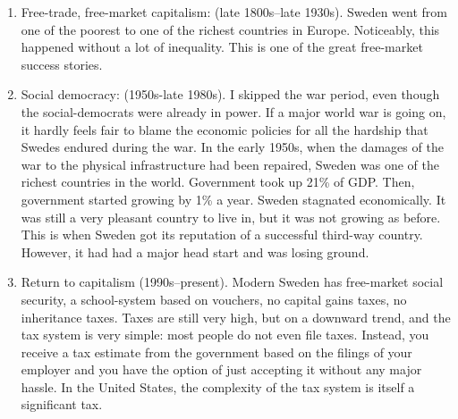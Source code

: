 \begin{enumerate}
\item Free-trade, free-market capitalism: (late 1800s--late 1930s). Sweden went
from one of the poorest to one of the richest countries in Europe. Noticeably,
this happened without a lot of inequality. This is one of the great free-market
success stories.
\item Social democracy: (1950s-late 1980s). I skipped the war period, even
though the social-democrats were already in power. If a major world war is
going on, it hardly feels fair to blame the economic policies for all the
hardship that Swedes endured during the war. In the early 1950s, when the
damages of the war to the physical infrastructure had been repaired, Sweden was
one of the richest countries in the world. Government took up 21\% of GDP.
Then, government started growing by 1\% a year. Sweden stagnated economically.
It was still a very pleasant country to live in,  but it was not growing as
before. This is when Sweden got its reputation of a successful third-way
country. However, it had had a major head start and was losing ground.
\item Return to capitalism (1990s--present). Modern Sweden has free-market
social security, a school-system based on vouchers, no capital gains taxes, no
inheritance taxes. Taxes are still very high, but on a downward trend, and the
tax system is very simple: most people do not even file taxes. Instead, you
receive a tax estimate from the government based on the filings of your
employer and you have the option of just accepting it without any major hassle.
In the United States, the complexity of the tax system is itself a significant
tax.
\end{enumerate}

